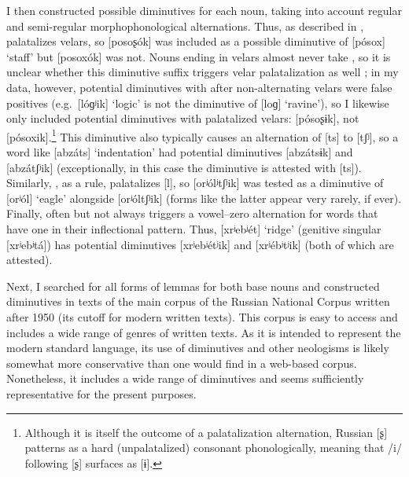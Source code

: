 \documentclass[output=paper,colorlinks,citecolor=brown
]{langscibook}
\begin{document}
I then constructed possible diminutives for each noun, taking into account regular and semi-regular morphophonological alternations. Thus, as described in , \ok{} palatalizes velars, so [posoʂók] was included as a possible diminutive of [pósox] `staff' but [posoxók] was not. Nouns ending in velars almost never take \ik{}, so it is unclear whether this diminutive suffix triggers velar palatalization as well \citep[see][]{Kapatsinski2010,Magomedova.Slioussar2017}; in my data, however, potential diminutives with \ik{} after non-alternating velars were false positives (e.g.\ [lóɡʲik] `logic' is not the diminutive of [loɡ] `ravine'), so I likewise only included potential \ik{} diminutives with palatalized velars: [pósoʂɨk], not [pósoxik].\footnote{Although it is itself the outcome of a palatalization alternation, Russian [ʂ] patterns as a hard (unpalatalized) consonant phonologically, meaning that /i/ following [ʂ] surfaces as [ɨ].} This diminutive also typically causes an alternation of [ts] to [tʃʲ], so a word like [abzáts] `indentation' had potential diminutives [abzátsɨk] and [abzátʃʲik] (exceptionally, in this case the diminutive is attested with [ts]). Similarly, \chik{}, as a rule, palatalizes [l], so [orʲólʲtʃʲik] was tested as a diminutive of [orʲól] `eagle' alongside [orʲóltʃʲik] (forms like the latter appear very rarely, if ever). Finally, \ik{} often but not always triggers a vowel--zero alternation for words that have one in their inflectional pattern. Thus, [xrʲebʲét] `ridge' (genitive singular [xrʲebʲtá]) has potential diminutives [xrʲebʲétʲik] and [xrʲébʲtʲik] (both of which are attested).

Next, I searched for all forms of lemmas for both base nouns and constructed diminutives in texts of the main corpus of the Russian National Corpus \citep{Savchuk.etal2024} %
written after 1950 (its cutoff for modern written texts). This corpus is easy to access and includes a wide range of genres of written texts. As it is intended to represent the modern standard language, its use of diminutives and other neologisms is likely somewhat more conservative than one would find in a web-based corpus. Nonetheless, it includes a wide range of diminutives and seems sufficiently representative for the present purposes.
\end{document}
